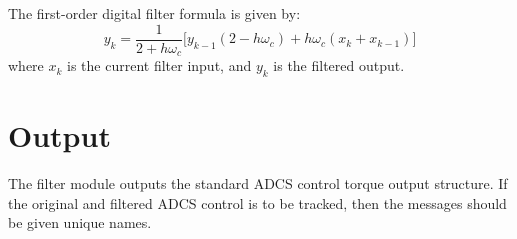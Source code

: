 \documentclass[]{AVSSimReportMemo}
\begin{document}
The first-order digital filter formula is given by:
\begin{equation}
		y_{k} = \frac{1}{2+h \omega_{c}}
		\Big[
		y_{k-1} (2-h \omega_{c})  + h \omega_{c} (x_{k} + x_{k-1})
		\Big]
\end{equation}
where $x_{k}$ is the current filter input, and $y_{k}$ is the filtered output.


\section{Output}
The filter module outputs the standard ADCS control torque output structure.  If the original and filtered ADCS control is to be tracked, then the messages should be given unique names.




\end{document}
